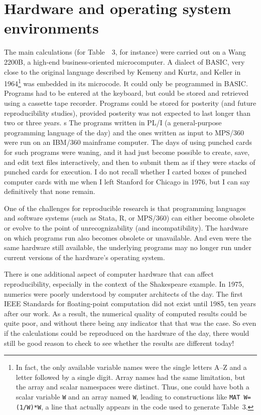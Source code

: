 \section{Hardware and operating system environments} %
\label{sec:hardware_and_operating_system_environments}

The main calculations (for Table~~3, for instance) were carried out on a Wang 2200B, a high-end business-oriented microcomputer.  A dialect of BASIC, very close to the original language described by Kemeny and Kurtz, and Keller in 1964\footnote{In fact, the only available variable names were the single letters A--Z and a letter followed by a single digit.  Array names had the same limitation, but the array and scalar namespaces were distinct.   Thus, one could have both a scalar variable \texttt{W} and an array named \texttt{W}, leading to constructions like \texttt{MAT W=(1/W)*W}, a line that actually appears in the code used to generate Table~3.} was embedded in its microcode.  It could only be programmed in BASIC.  Programs had to be entered at the keyboard, but could be stored and retrieved using a cassette tape recorder. Programs could be stored for posterity (and future reproducibility studies), provided posterity was not expected to last longer than two or three years.
s
The programs written in PL/I (a general-purpose programming language of the day) and the ones written as input to MPS/360 were run on an IBM/360 mainframe computer.  The days of using punched cards for such programs were waning, and it had just become possible to create, save, and edit text files interactively, and then to submit them as if they were stacks of punched cards for execution.  I do not recall whether I carted boxes of punched computer cards with me when I left Stanford for Chicago in 1976, but I can say definitively that none remain.

One of the challenges for reproducible research is that programming languages and software systems (such as Stata, R, or MPS/360) can either become obsolete or evolve to the point of unrecognizability (and incompatibility).  The hardware on which programs run also becomes obsolete or unavailable.  And even were the same hardware still available, the underlying programs may no longer run under current versions of the hardware's operating system.

There is one additional aspect of computer hardware that can affect reproducibility, especially in the context of the Shakespeare example.  In 1975, numerics were poorly understood by computer architects of the day.  The first IEEE Standards for floating-point computation did not exist until 1985, ten years after our work.  As a result, the numerical quality of computed results could be quite poor, and without there being any indicator that that was the case.  So even if the calculations could be reproduced on the hardware of the day, there would still be good reason to check to see whether the results are different today!

